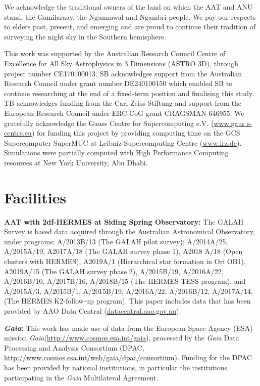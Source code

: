 \documentclass[fleqn,usenatbib]{mnras}
\newcommand{\Gaia}{\textit{Gaia}\xspace} %
\begin{document}
We acknowledge the traditional owners of the land on which the AAT and ANU stand, the Gamilaraay, the Ngunnawal and Ngambri people. We pay our respects to elders past, present, and emerging and are proud to continue their tradition of surveying the night sky in the Southern hemisphere.

This work was supported by the Australian Research Council Centre of Excellence for All Sky Astrophysics in 3 Dimensions (ASTRO 3D), through project number CE170100013. SB acknowledges support from the Australian Research Council under grant number DE240100150 which enabled SB to continue researching at the end of a fixed-term position and finalising this study. TB acknowledges funding from the Carl Zeiss Stiftung and support from the European Research Council under ERC-CoG grant CRAGSMAN-646955. We gratefully acknowledge the Gauss Centre for Supercomputing e.V. (\url{www.gaus s-centre.eu}) for funding this project by providing computing time on the GCS Supercomputer SuperMUC at Leibniz Supercomputing Centre (\url{www.lrz.de}). Simulations were partially computed with High Performance Computing resources at New York University, Abu Dhabi.

\section*{Facilities}

\textbf{AAT with 2df-HERMES at Siding Spring Observatory:} The GALAH Survey is based data acquired through the Australian Astronomical Observatory, under programs: A/2013B/13 (The GALAH pilot survey); A/2014A/25, A/2015A/19, A2017A/18 (The GALAH survey phase 1), A2018 A/18 (Open clusters with HERMES), A2019A/1 (Hierarchical star formation in Ori OB1), A2019A/15 (The GALAH survey phase 2), A/2015B/19, A/2016A/22, A/2016B/10, A/2017B/16, A/2018B/15 (The HERMES-TESS program), and A/2015A/3, A/2015B/1, A/2015B/19, A/2016A/22, A/2016B/12, A/2017A/14, (The HERMES K2-follow-up program). This paper includes data that has been provided by AAO Data Central (\url{datacentral.aao.gov.au}).

\textbf{\Gaia: } This work has made use of data from the European Space Agency (ESA) mission \Gaia (\url{http://www.cosmos.esa.int/gaia}), processed by the \Gaia Data Processing and Analysis Consortium (DPAC, \url{http://www.cosmos.esa.int/web/gaia/dpac/consortium}). Funding for the DPAC has been provided by national institutions, in particular the institutions participating in the \Gaia Multilateral Agreement. 
\end{document}
